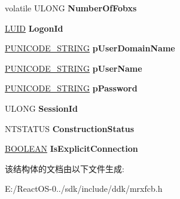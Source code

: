 \begin{DoxyCompactItemize}
volatile U\+L\+O\+NG {\bfseries Number\+Of\+Fobxs}
\item 
\mbox{\label{struct___m_r_x___v___n_e_t___r_o_o_t___aff1f9e302213de4f5b8afe044ac80255}} 
\hyperlink{struct___l_u_i_d}{L\+U\+ID} {\bfseries Logon\+Id}
\item 
\mbox{\label{struct___m_r_x___v___n_e_t___r_o_o_t___a9d9e6def227022a804626116033b7ec8}} 
\hyperlink{struct___u_n_i_c_o_d_e___s_t_r_i_n_g}{P\+U\+N\+I\+C\+O\+D\+E\+\_\+\+S\+T\+R\+I\+NG} {\bfseries p\+User\+Domain\+Name}
\item 
\mbox{\label{struct___m_r_x___v___n_e_t___r_o_o_t___aeb00a6d21cebd8901c00fddf12b8eefa}} 
\hyperlink{struct___u_n_i_c_o_d_e___s_t_r_i_n_g}{P\+U\+N\+I\+C\+O\+D\+E\+\_\+\+S\+T\+R\+I\+NG} {\bfseries p\+User\+Name}
\item 
\mbox{\label{struct___m_r_x___v___n_e_t___r_o_o_t___aeba274851fedd675002f8eab67f2e40d}} 
\hyperlink{struct___u_n_i_c_o_d_e___s_t_r_i_n_g}{P\+U\+N\+I\+C\+O\+D\+E\+\_\+\+S\+T\+R\+I\+NG} {\bfseries p\+Password}
\item 
\mbox{\label{struct___m_r_x___v___n_e_t___r_o_o_t___aab78dc89b073287eb2edb5575b4dff35}} 
U\+L\+O\+NG {\bfseries Session\+Id}
\item 
\mbox{\label{struct___m_r_x___v___n_e_t___r_o_o_t___a07544b7d12fc41fca67f193952a5fd8b}} 
N\+T\+S\+T\+A\+T\+US {\bfseries Construction\+Status}
\item 
\mbox{\label{struct___m_r_x___v___n_e_t___r_o_o_t___a1e6cfed998a7ab8d1652ad6fffb1d042}} 
\hyperlink{_processor_bind_8h_a112e3146cb38b6ee95e64d85842e380a}{B\+O\+O\+L\+E\+AN} {\bfseries Is\+Explicit\+Connection}
\end{DoxyCompactItemize}


该结构体的文档由以下文件生成\+:\begin{DoxyCompactItemize}
\item 
E\+:/\+React\+O\+S-\/0../sdk/include/ddk/mrxfcb.\+h\end{DoxyCompactItemize}
